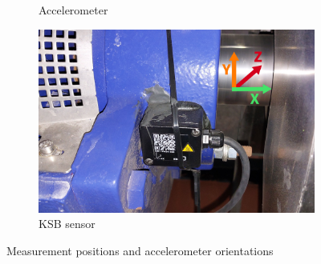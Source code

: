 \documentclass{llncs}
\begin{document}
\begin{figure}
\begin{subfigure}[b]{0.24\textwidth}
         \caption{Accelerometer}
         \label{fig:steval-sensor}
     \end{subfigure}
     \hfill
     \begin{subfigure}[b]{0.24\textwidth}
         \centering
         \includegraphics[width=\textwidth]{fig/sensor/ksb-cloud.jpg}
         \caption{KSB sensor}
         \label{fig:ksb-cloud-sensor}
     \end{subfigure}
     \caption{Measurement positions and accelerometer orientations}
\end{figure}
\end{document}
